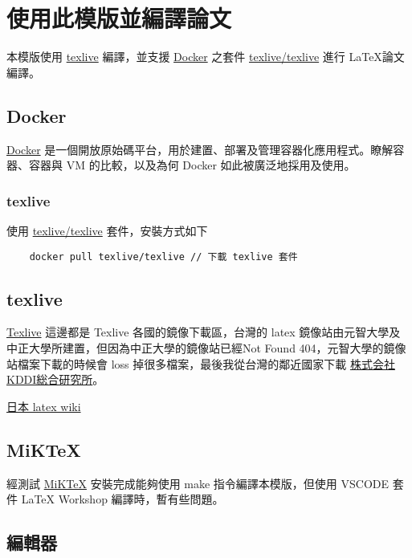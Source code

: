 
\chapter{使用此模版並編譯論文}\label{Compiled}

本模版使用 \href{https://tug.org/texlive/}{texlive} 編譯，並支援 \href{https://www.docker.com/}{Docker} 之套件 \href{https://hub.docker.com/r/texlive/texlive}{texlive/texlive} 進行 \LaTeX 論文編譯。

\section{Docker}\label{docker}

\href{https://www.docker.com/}{Docker} 是一個開放原始碼平台，用於建置、部署及管理容器化應用程式。瞭解容器、容器與 VM 的比較，以及為何 Docker 如此被廣泛地採用及使用。

\subsection{texlive}

使用 \href{https://hub.docker.com/r/texlive/texlive}{texlive/texlive} 套件，安裝方式如下

\begin{lstlisting}
    docker pull texlive/texlive // 下載 texlive 套件

\end{lstlisting}

\section{texlive}
\href{https://www.tug.org/texlive/}{Texlive}
這邊都是 Texlive 各國的鏡像下載區，台灣的 latex 鏡像站由元智大學及中正大學所建置，但因為中正大學的鏡像站已經Not Found 404，元智大學的鏡像站檔案下載的時候會 loss 掉很多檔案，最後我從台灣的鄰近國家下載 \href{http://ftp.kddilabs.jp/}{株式会社KDDI総合研究所}。

\href{https://texwiki.texjp.org/}{日本 latex wiki}

\section{MiKTeX}
經測試 \href{https://miktex.org/}{MiKTeX} 安裝完成能夠使用 make 指令編譯本模版，但使用 VSCODE 套件 LaTeX Workshop 編譯時，暫有些問題。

\section{編輯器}\label{editor}

